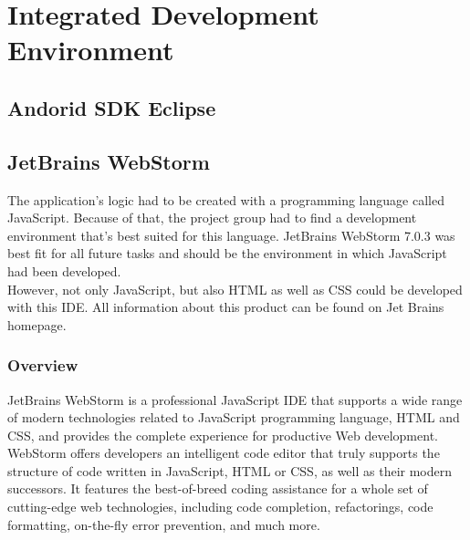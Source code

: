 \chapter{Integrated Development Environment}


\section{Andorid SDK Eclipse}




















\section{JetBrains WebStorm}
The application's logic had to be created with a programming language called JavaScript. Because of that, the project group had to find a development environment that's best suited for this language. JetBrains WebStorm 7.0.3 was best fit for all future tasks and should be the environment in which JavaScript had been developed. 
\\

However, not only JavaScript, but also HTML as well as CSS could be developed with this IDE. All information about this product can be found on Jet Brains homepage.\cite{webstorm}
\subsection{Overview}
JetBrains WebStorm is a professional JavaScript IDE that supports a wide range of modern technologies related to JavaScript programming language, HTML and  CSS, and provides the complete experience for productive Web development.
\\

WebStorm offers developers an intelligent code editor that truly supports the structure of code written in JavaScript, HTML or CSS, as well as their modern  successors. It features the best-of-breed coding assistance for a whole set of  cutting-edge web technologies, including code completion, refactorings, code formatting, on-the-fly error prevention, and much more. 
\\

